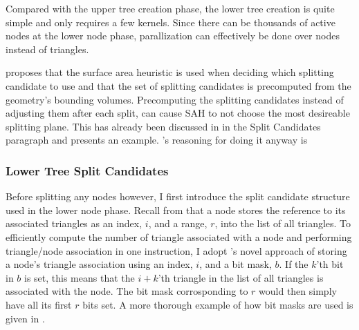 Compared with the upper tree creation phase, the lower tree creation is quite
simple and only requires a few kernels. Since there can be thousands of active
nodes at the lower node phase, parallization can effectively be done over nodes
instead of triangles.

\zhou{} proposes that the surface area heuristic is used when deciding which
splitting candidate to use and that the set of splitting candidates is
precomputed from the geometry's bounding volumes. Precomputing the splitting
candidates instead of adjusting them after each split, can cause SAH to not
choose the most desireable splitting plane. This has already been discussed in
 in the Split Candidates paragraph and
 presents an example. \zhou's reasoning for doing it
anyway is




\subsubsection{Lower Tree Split Candidates}



Before splitting any nodes however, I first introduce the split candidate
structure used in the lower node phase. Recall from
 that a node stores the reference to its
associated triangles as an index, $i$, and a range, $r$, into the list of all
triangles. To efficiently compute the number of triangle associated with a node
and performing triangle/node association in one instruction, I adopt \zhou's
novel approach of storing a node's triangle association using an index, $i$, and
a bit mask, $b$. If the $k$'th bit in $b$ is set, this means that the $i+k$'th
triangle in the list of all triangles is associated with the node. The bit mask
corrosponding to $r$ would then simply have all its first $r$ bits set. A more
thorough example of how bit masks are used is given in .

